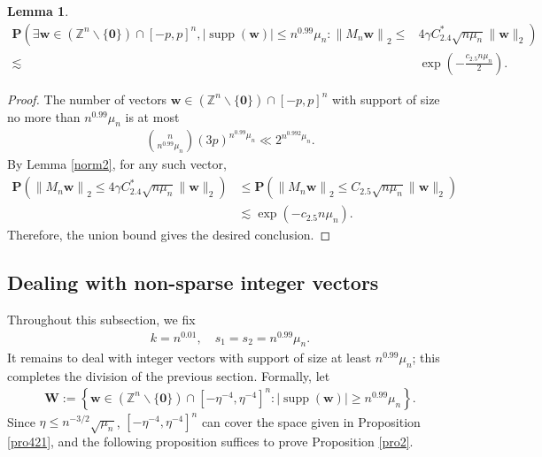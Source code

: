 \documentclass{article}
\numberwithin{equation}{section}
\theoremstyle{plain}
\newtheorem{lemma}{Lemma}[section]
\begin{document}
\begin{lemma}\label{422}
\begin{align*}
\textbf{P}\left(\exists \boldsymbol{w} \in\left(\mathbb{Z}^n \backslash\{\mathbf{0}\}\right) \cap[-p, p]^n,|\operatorname{supp}(\boldsymbol{w})| \leq n^{0.99}\mu_{n}:\left\|M_n \boldsymbol{w}\right\|_2 \leq\right. & \left.4 \gamma C^*_{2.4} \sqrt{n\mu_{n}}\|\boldsymbol{w}\|_2\right) \\
\lesssim & \exp \left(-\frac{c_{2.5} n\mu_{n}}{2}\right).
\end{align*}
\end{lemma}
\begin{proof}
The number of vectors $\boldsymbol{w} \in\left(\mathbb{Z}^n \backslash\{\mathbf{0}\}\right) \cap[-p, p]^n$ with support of size no more than $n^{0.99}\mu_{n}$ is at most
\begin{align*}
\binom{n}{n^{0.99}\mu_{n}}(3 p)^{n^{0.99}\mu_{n}} \ll 2^{n^{0.992}\mu_{n}}.
\end{align*}
By Lemma \ref{norm2}, for any such vector,
\begin{align*}
\textbf{P}\left(\left\|M_n \boldsymbol{w}\right\|_2 \leq 4 \gamma C^*_{2.4} \sqrt{n\mu_{n}}\|\boldsymbol{w}\|_2\right) & \leq \textbf{P}\left(\left\|M_n \boldsymbol{w}\right\|_2 \leq C_{2.5} \sqrt{n\mu_{n}}\|\boldsymbol{w}\|_2\right) \\
& \lesssim \exp \left(-c_{2.5} n\mu_{n}\right).
\end{align*}
Therefore, the union bound gives the desired conclusion.
\end{proof}

\subsection{Dealing with non-sparse integer vectors}
Throughout this subsection, we fix
\begin{align*}
k=n^{0.01}, \quad s_1=s_2=n^{0.99}\mu_{n}.
\end{align*}
It remains to deal with integer vectors with support of size at least $n^{0.99}\mu_{n}$; this completes the division of the previous section. Formally, let
\begin{align*}
\boldsymbol{W}:=\left\{\boldsymbol{w} \in\left(\mathbb{Z}^n \backslash\{\mathbf{0}\}\right) \cap\left[-\eta^{-4}, \eta^{-4}\right]^n:|\operatorname{supp}(\boldsymbol{w})| \geq n^{0.99}\mu_{n}\right\} .
\end{align*}
Since $\eta \leq n^{-3 / 2}\sqrt{\mu_{n}}$, $\left[-\eta^{-4}, \eta^{-4}\right]^n$ can cover the space given in Proposition \ref{pro421}, and the following proposition suffices to prove Proposition \ref{pro2}.
\end{document}
